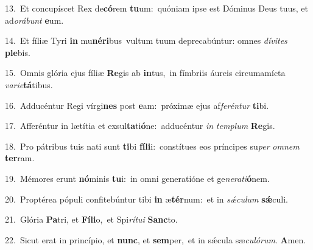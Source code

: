 {\numbfont\textcolor{\numbcolor}{13.}}~Et concupíscet Rex de\-\textbf{có}\-rem \textbf{tu}\-um:~\star quóniam ipse est Dóminus Deus tuus, et ad\-\textit{o}\-\textit{rá}\textit{bunt} \textbf{e}\-um.\par
{\numbfont\textcolor{\numbcolor}{14.}}~Et fíliæ Tyri \textbf{in} mu\-\textbf{né}\-\textbf{ri}bus~\star vultum tuum deprecabúntur: omnes \textit{dí}\-\textit{vi}\textit{tes} \textbf{ple}\-bis.\par
{\numbfont\textcolor{\numbcolor}{15.}}~Omnis glória ejus fíliæ \textbf{Re}\-gis ab \textbf{in}\-tus,~\star in fímbriis áureis circumamícta \textit{va}\-\textit{ri}\textit{e}\textbf{tá}tibus.\par
{\numbfont\textcolor{\numbcolor}{16.}}~Adducéntur Regi vírgi\textbf{nes} post \textbf{e}\-am:~\star próximæ ejus af\-\textit{fe}\-\textit{rén}\textit{tur} \textbf{ti}\-bi.\par
{\numbfont\textcolor{\numbcolor}{17.}}~Afferéntur in lætítia et exsul\-\textbf{ta}\-ti\-\textbf{ó}\-ne:~\star adducéntur \textit{in} \textit{tem}\-\textit{plum} \textbf{Re}\-gis.\par
{\numbfont\textcolor{\numbcolor}{18.}}~Pro pátribus tuis nati sunt \textbf{ti}\-bi \textbf{fí}\-\textbf{li}i:~\star constítues eos príncipes su\textit{per} \textit{om}\-\textit{nem} \textbf{ter}\-ram.\par
{\numbfont\textcolor{\numbcolor}{19.}}~Mémores erunt \textbf{nó}\-minis \textbf{tu}\-i:~\star in omni generatióne et ge\-\textit{ne}\-\textit{ra}\textit{ti}\textbf{ó}nem.\par
{\numbfont\textcolor{\numbcolor}{20.}}~Proptérea pópuli confitebúntur tibi \textbf{in} æ\-\textbf{tér}\-num:~\star et in \textit{sǽ}\-\textit{cu}\textit{lum} \textbf{sǽ}\-culi.\par
{\numbfont\textcolor{\numbcolor}{21.}}~Glória \textbf{Pa}\-tri, et \textbf{Fí}\-\textbf{li}o,~\star et Spi\-\textit{rí}\-\textit{tu}\textit{i} \textbf{Sanc}\-to.\par
{\numbfont\textcolor{\numbcolor}{22.}}~Sicut erat in princípio, et \textbf{nunc}\-, et \textbf{sem}\-per,~\star et in sǽcula sæ\-\textit{cu}\-\textit{ló}\textit{rum}. \textbf{A}\-men.\par
